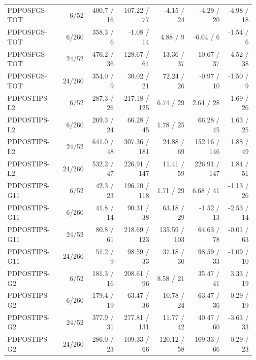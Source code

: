 \begin{longtable}{p{26mm}rrrrrr}
PDPOSFGS-TOT & 6/52 & 400.7 / 16 & 107.22 / 77 & -4.15 / 24 & -4.29 / 20 & -4.98 / 18 \\
PDPOSFGS-TOT & 6/260 & 358.3 / 6 & -1.08 / 14 & 4.88 / 9 & -6.04 / 6 & -1.54 / 6 \\
PDPOSFGS-TOT & 24/52 & 476.2 / 36 & 128.67 / 64 & 13.36 / 37 & 10.67 / 37 & 4.52 / 38 \\
PDPOSFGS-TOT & 24/260 & 354.0 / 9 & 30.02 / 21 & 72.24 / 26 & -0.97 / 10 & -1.50 / 9 \\
PDPOSTIPS-L2 & 6/52 & 287.3 / 26 & 217.18 / 125 & 6.74 / 29 & 2.64 / 28 & 1.69 / 26 \\
PDPOSTIPS-L2 & 6/260 & 269.3 / 24 & 66.28 / 45 & 1.78 / 25 & 66.28 / 45 & 1.63 / 25 \\
PDPOSTIPS-L2 & 24/52 & 641.0 / 48 & 307.36 / 181 & 24.88 / 69 & 152.16 / 146 & 1.88 / 49 \\
PDPOSTIPS-L2 & 24/260 & 532.2 / 47 & 226.91 / 147 & 11.41 / 59 & 226.91 / 147 & 1.84 / 51 \\
PDPOSTIPS-G11 & 6/52 & 42.3 / 23 & 196.70 / 118 & 1.71 / 29 & 6.68 / 41 & -1.13 / 26 \\
PDPOSTIPS-G11 & 6/260 & 41.8 / 14 & 90.31 / 38 & 63.18 / 29 & -1.52 / 13 & -2.53 / 14 \\
PDPOSTIPS-G11 & 24/52 & 80.8 / 61 & 218.69 / 123 & 135.59 / 103 & 64.63 / 78 & -0.01 / 63 \\
PDPOSTIPS-G11 & 24/260 & 51.2 / 9 & 98.59 / 33 & 37.18 / 30 & 98.59 / 33 & -1.09 / 10 \\
PDPOSTIPS-G2 & 6/52 & 181.3 / 16 & 208.61 / 96 & 8.58 / 21 & 35.47 / 41 & 3.33 / 19 \\
PDPOSTIPS-G2 & 6/260 & 179.4 / 19 & 63.47 / 36 & 10.78 / 24 & 63.47 / 36 & -0.29 / 19 \\
PDPOSTIPS-G2 & 24/52 & 377.9 / 31 & 277.81 / 131 & 11.77 / 42 & 40.47 / 60 & -3.63 / 33 \\
PDPOSTIPS-G2 & 24/260 & 286.0 / 23 & 109.33 / 66 & 120.12 / 58 & 109.33 / 66 & 0.29 / 23 \\
\end{longtable}
\endgroup

